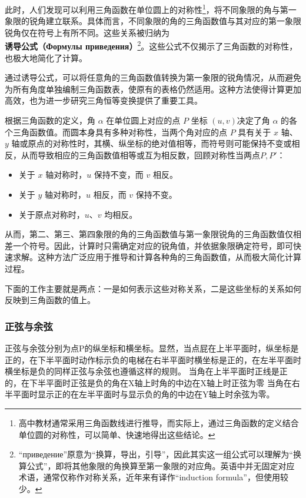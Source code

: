 此时，人们发现可以利用三角函数在单位圆上的对称性\footnote{高中教材通常采用三角函数线进行推导，而实际上，通过三角函数的定义结合单位圆的对称性，可以简单、快速地得出这些结论。}，将不同象限的角与第一象限的锐角建立联系。具体而言，不同象限的角的三角函数值与其对应的第一象限锐角仅在符号上有所不同。这些关系被归纳为\textbf{诱导公式（Формулы приведения）}\footnote{“приведение”原意为“换算，导出，引导”，因此其实这一组公式可以理解为“换算公式”，即将其他象限的角换算至第一象限的对应角。英语中并无固定对应术语，通常仅称作对称关系，近年来有译作“induction formula”，但使用较少。}。这些公式不仅揭示了三角函数的对称性，也极大地简化了计算。

通过诱导公式，可以将任意角的三角函数值转换为第一象限的锐角情况，从而避免为所有角度单独编制三角函数表，使原有的表格仍然适用。这种方法使得计算更加高效，也为进一步研究三角恒等变换提供了重要工具。

根据三角函数的定义，角 $\alpha$ 在单位圆上对应的点 $P$ 坐标 $(u,v)$决定了角 $\alpha$ 的各个三角函数值。而圆本身具有多种对称性，当两个角对应的点 $P$ 具有关于 $x$ 轴、$y$ 轴或原点的对称性时，其横、纵坐标的绝对值相等，而符号则可能保持不变或相反，从而导致相应的三角函数值相等或互为相反数，回顾对称性当两点$P,P'$：

\begin{itemize}
\item 关于 $x$ 轴对称时，$u$ 保持不变，而 $v$ 相反。
\item 关于 $y$ 轴对称时，$u$ 相反，而 $v$ 保持不变。
\item 关于原点对称时，$u$、$v$ 均相反。
\end{itemize}

从而，第二、第三、第四象限的角的三角函数值与第一象限锐角的三角函数值仅相差一个符号。因此，计算时只需确定对应的锐角值，并依据象限确定符号，即可快速求解。这种方法广泛应用于推导和计算各种角的三角函数值，从而极大简化计算过程。

下面的工作主要就是两点：一是如何表示这些对称关系，二是这些坐标的关系如何反映到三角函数的值上。


\subsubsection{正弦与余弦}


正弦与余弦分别为点P的纵坐标和横坐标。显然，当点屁在上半平面时，纵坐标是正的，在下半平面时动作标示负的电梯在右半平面时横坐标是正的，在左半平面时横坐标是负的同样正弦与余弦也遵循这样的规则。
当角在上半平面时正线是正的，在下半平面时正弦是负的角在X轴上时角的中边在X轴上时正弦为零
当角在右半平面时显示正的在左半平面时与显示负的角的中边在Y轴上时余弦为零。


